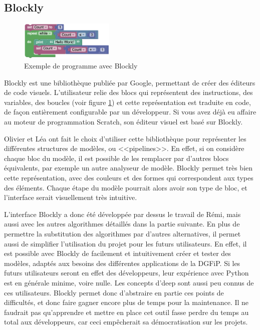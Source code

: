 \documentclass[openany, 11pt]{memoir}
\begin{document}
\subsection{Blockly}

\begin{figure}[ht]
	\centering
	\includegraphics[width=0.4\textwidth]{images/blockly.png}
	\caption{Exemple de programme avec Blockly}
	\label{blockly}
\end{figure}

Blockly est une bibliothèque publiée par Google, permettant de créer des éditeurs de code visuels. L'utilisateur relie des blocs qui représentent des instructions, des variables, des boucles (voir figure \ref{blockly}) et cette représentation est traduite en code, de façon entièrement configurable par un développeur. Si vous avez déjà eu affaire au moteur de programmation Scratch, son éditeur visuel est basé sur Blockly.

\bigskip
Olivier et Léa ont fait le choix d'utiliser cette bibliothèque pour représenter les différentes structures de modèles, ou <<pipelines>>. En effet, si on considère chaque bloc du modèle, il est possible de les remplacer par d'autres blocs équivalents, par exemple un autre analyseur de modèle. Blockly permet très bien cette représentation, avec des couleurs et des formes qui correspondent aux types des éléments. Chaque étape du modèle pourrait alors avoir son type de bloc, et l'interface serait visuellement très intuitive.

L'interface Blockly a donc été développée par dessus le travail de Rémi, mais aussi avec les autres algorithmes détaillés dans la partie suivante. En plus de permettre la substitution des algorithmes par d'autres alternatives, il permet aussi de simplifier l'utilisation du projet pour les futurs utilisateurs. En effet, il est possible avec Blockly de facilement et intuitivement créer et tester des modèles, adaptés aux besoins des différentes applications de la \gls{DGFiP}. Si les futurs utilisateurs seront en effet des développeurs, leur expérience avec Python est en générale minime, voire nulle. Les concepts d'\gls{deep} sont aussi peu connus de ces utilisateurs. Blockly permet donc d'abstraire en partie ces points de difficultés, et donc faire gagner encore plus de temps pour la maintenance. Il ne faudrait pas qu'apprendre et mettre en place cet outil fasse perdre du temps au total aux développeurs, car ceci empêcherait sa démocratisation sur les projets.
\end{document}
